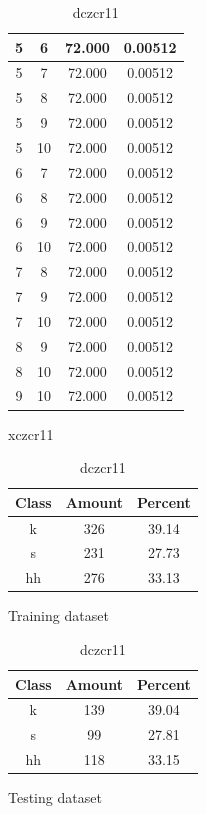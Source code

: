 \begin{table}
\begin{subtable}[tbp]{0.4\textwidth}
\begin{tabular}{|c|c|c|c|}
 5 & 6 & 72.000 & 0.00512\\ \hline 
 5 & 7 & 72.000 & 0.00512\\ \hline 
 5 & 8 & 72.000 & 0.00512\\ \hline 
 5 & 9 & 72.000 & 0.00512\\ \hline 
 5 & 10 & 72.000 & 0.00512\\ \hline 
 6 & 7 & 72.000 & 0.00512\\ \hline 
 6 & 8 & 72.000 & 0.00512\\ \hline 
 6 & 9 & 72.000 & 0.00512\\ \hline 
 6 & 10 & 72.000 & 0.00512\\ \hline 
 7 & 8 & 72.000 & 0.00512\\ \hline 
 7 & 9 & 72.000 & 0.00512\\ \hline 
 7 & 10 & 72.000 & 0.00512\\ \hline 
 8 & 9 & 72.000 & 0.00512\\ \hline 
 8 & 10 & 72.000 & 0.00512\\ \hline 
 9 & 10 & 72.000 & 0.00512\\ \hline 

\end{tabular}
 \label{xlzcr11}
\caption{xczcr11}
\end{subtable}


\begin{subtable}[h]{0.45\textwidth}
\centering
\begin{tabular}{|c|c|c|}
\hline
Class & Amount & Percent\\ \hline
k & 326 & 39.14\\ \hline
s & 231 & 27.73\\ \hline
hh & 276 & 33.13\\ \hline
\end{tabular}
\caption{Training dataset}
\end{subtable}
\hfill
\begin{subtable}[h]{0.45\textwidth}
\centering
\begin{tabular}{|c|c|c|}
\hline
Class & Amount & Percent\\ \hline
k & 139 & 39.04\\ \hline
s & 99 & 27.81\\ \hline
hh & 118 & 33.15\\ \hline
\end{tabular}
\caption{Testing dataset}
\end{subtable}
\hfill

\label{dlzcr11}

\caption{dczcr11}

\end{table}\clearpage